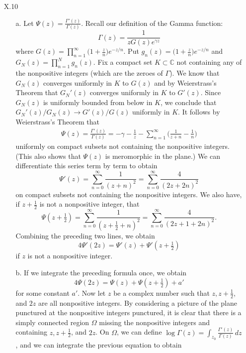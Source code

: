 \documentclass[11pt]{book}
\theoremstyle{definition}
\begin{document}
\begin{enumerate}
    \item[X.10] 
      \begin{enumerate}
        \item[a.]
      Let $\Psi(z) = \frac{\Gamma'(z)}{\Gamma(z)}$.   Recall our definition of the Gamma function:
      \[ \Gamma(z) = \frac{1}{zG(z)e^{\gamma z}} \] where $G(z) = \prod_{n=1}^\infty \Big(1 + \frac{z}{n} \Big) e^{-z/n}$.   Put $g_n(z) = \Big(1 + \frac z n \Big) e^{-z/n}$ and $G_N (z) =  \prod_{n=1}^N g_n(z)$.   Fix a compact set $K \subset \mathbb C$ not containing any of the nonpositive integers (which are the zeroes of $\Gamma$).  %
    We know that $G_N(z)$ converges uniformly in $K$ to $G(z)$ and by Weierstrass's Theorem that $G_N'(z)$ converges uniformly in $K$ to $G'(z)$. Since $G_N(z)$ is uniformly bounded from below in $K$, we conclude that $G_N'(z) / G_N(z) \to G'(z) / G(z)$ uniformly in $K$.  It follows by Weierstrass's Theorem that  
    \begin{align*}
      \Psi(z) = \frac{\Gamma'(z)}{\Gamma(z)} = - \gamma - \frac{1}{z} - \sum_{n=1}^\infty \Big( \frac{1}{z+n} - \frac{1}{n}   \Big)
    \end{align*}
    uniformly on compact subsets not containing the nonpositive integers.  (This also shows that $\Psi(z)$ is meromorphic in the plane.)  We can differentiate this series term by term to obtain 
    \[ \Psi'(z) = \sum_{n=0}^\infty \frac{1}{(z+n)^2} = \sum_{n=0}^\infty \frac{4}{(2z+2n)^2} \] on compact subsets not containing the nonpositive integers.  We also have, if $z + \tfrac 1 2$ is not a nonpositive integer, that 
    \[ \Psi(z + \tfrac 1 2 ) =  \sum_{n=0}^\infty \frac{1}{(z + \tfrac 1 2 + n)^2} = \sum_{n=0}^\infty  \frac{4}{(2z + 1 + 2n)^2} .\] Combining the preceding two lines, we obtain
    \[ 4\Psi'(2z) = \Psi'(z) + \Psi'(z+\tfrac 1 2) \] if $z$ is not a nonpositive integer.  
    \item[b.]  If we integrate the preceding formula once, we obtain
      \[ 4\Psi(2z) = \Psi(z) + \Psi(z+\tfrac 1 2) + a' \] for some constant $a'$.   Now let $z$ be a complex number such that $z, z+\tfrac 1 2$, and $2z$ are all nonpositive integers.   By considering a picture of the plane punctured at the nonpositive integers punctured,  it is clear that there is a simply connected region $\Omega$ missing the nonpositive integers and containing $z,z+\tfrac 1 2$, and $2z$.   On $\Omega$, we can define $\log \Gamma(z) = \int_{z_0} \frac{\Gamma'(z)}{\Gamma(z)} \, dz$, and we can integrate the previous equation to obtain

\end{enumerate}
\end{enumerate}
\end{document}
